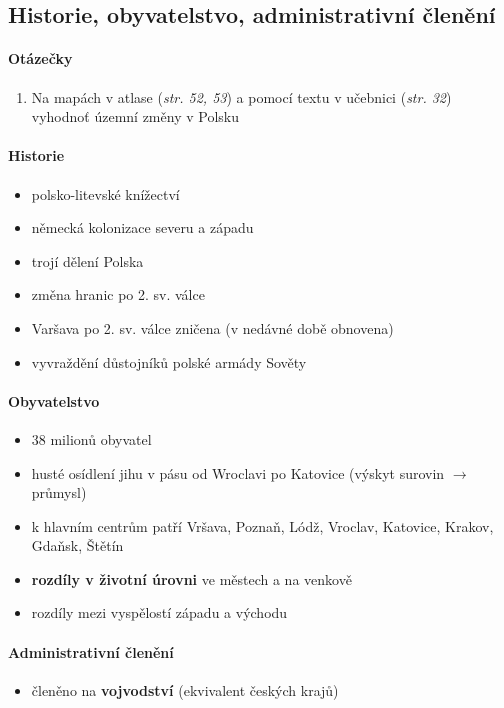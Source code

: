 \documentclass[10pt,a4paper]{article}
\begin{document}
\subsection{Historie, obyvatelstvo, administrativní členění}
\paragraph{Otázečky}
\begin{enumerate}
\item Na mapách v atlase (\textit{str. 52, 53}) a pomocí textu v učebnici (\textit{str. 32}) vyhodnoť územní změny v Polsku
\end{enumerate}

\paragraph{Historie}
\begin{itemize}
\item polsko-litevské knížectví
\item německá kolonizace severu a západu
\item trojí dělení Polska
\item změna hranic po 2. sv. válce
\item Varšava po 2. sv. válce zničena (v nedávné době obnovena)
\item vyvraždění důstojníků polské armády Sověty
\end{itemize}

\paragraph{Obyvatelstvo}
\begin{itemize}
\item 38 milionů obyvatel
\item husté osídlení jihu v pásu od Wroclavi po Katovice (výskyt surovin $\rightarrow$ průmysl)
\item k hlavním centrům patří Vršava, Poznaň, Lódž, Vroclav, Katovice, Krakov, Gdaňsk, Štětín
\item \textbf{rozdíly v životní úrovni} ve městech a na venkově
\item rozdíly mezi vyspělostí západu a východu
\end{itemize}

\paragraph{Administrativní členění}
\begin{itemize}
\item členěno na \textbf{vojvodství} (ekvivalent českých krajů)
\end{itemize}
\end{document}
